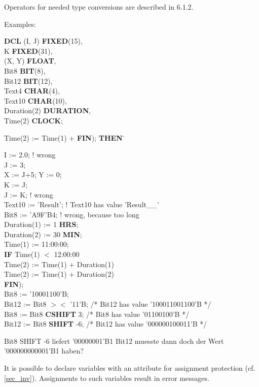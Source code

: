 Operators for needed type conversions are described in 6.1.2.

Examples:

{\bf DCL} (I, J) {\bf FIXED}(15),\\
\x K {\bf FIXED}(31),\\
\x (X, Y) {\bf FLOAT},\\
\x Bit8 {\bf BIT}(8),\\
\x Bit12 {\bf BIT}(12),\\
\x Text4 {\bf CHAR}(4),\\
\x Text10 {\bf CHAR}(10),\\
\x Duration(2) {\bf DURATION},\\
\x Time(2) {\bf CLOCK};

\begin{tabbing}
Time(2) := Time(1) + \= {\bf FIN}); \= {\bf THEN} \= \kill

I := 2.0; \> \> \> ! wrong \\
J := 3;   \> \> \> \\
X := J+5; Y := 0; \> \> \> \\
K := J;   \> \> \> \\
J := K;   \> \> \> ! wrong\\
Text10 := 'Result'; \> \> \> ! Text10 has value 'Result\_\_' \\
Bit8 := 'A9F'B4;    \> \> \>! wrong, because too long \\
Duration(1) := 1 {\bf HRS}; \> \> \>\\
Duration(2) := 30 {\bf MIN}; \> \> \> \\
Time(1) := 11:00:00; \> \> \>\\
{\bf IF} Time(1) $<$ 12:00:00 \> \\
          Time(2) := Time(1) + Duration(1) \> \\
          Time(2) := Time(1) + Duration(2) \> \\
{\bf FIN}); \> \> \\

Bit8 := '10001100'B; \> \> \> \\
Bit12 := Bit8 $><$ '11'B; \> \> \> /* Bit12 has value '100011001100'B */ \\
Bit8 := Bit8 {\bf CSHIFT} 3; \> \> \> /* Bit8 has value '01100100'B */ \\
Bit12 := Bit8 {\bf SHIFT} -6; \> \> \> /* Bit12 has value '000000100011'B */ \\
\end{tabbing}
\begin{discuss}
Bit8 SHIFT -6 liefert '00000001'B1
Bit12 muesste dann doch der Wert '000000000001'B1 haben?
\end{discuss}
It is possible to declare variables with an attribute for assignment
protection (cf.  \ref{sec_inv}). Assignments to such variables result in error
messages.

